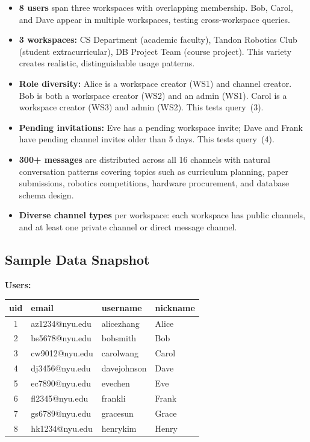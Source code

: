 \documentclass[11pt]{article}
\begin{document}
\begin{itemize}
    \item \textbf{8 users} span three workspaces with overlapping membership. Bob, Carol, and Dave appear in multiple workspaces, testing cross-workspace queries.
    \item \textbf{3 workspaces:} CS Department (academic faculty), Tandon Robotics Club (student extracurricular), DB Project Team (course project). This variety creates realistic, distinguishable usage patterns.
    \item \textbf{Role diversity:} Alice is a workspace creator (WS1) and channel creator. Bob is both a workspace creator (WS2) and an admin (WS1). Carol is a workspace creator (WS3) and admin (WS2). This tests query~(3).
    \item \textbf{Pending invitations:} Eve has a pending workspace invite; Dave and Frank have pending channel invites older than 5 days. This tests query~(4).
    \item \textbf{300+ messages} are distributed across all 16 channels with natural conversation patterns covering topics such as curriculum planning, paper submissions, robotics competitions, hardware procurement, and database schema design.
    \item \textbf{Diverse channel types} per workspace: each workspace has public channels, and at least one private channel or direct message channel.
\end{itemize}

\subsection{Sample Data Snapshot}

\noindent\textbf{Users:}
\begin{center}
\tiny
\begin{tabular}{clll}
\toprule
uid & email & username & nickname \\
\midrule
1 & az1234@nyu.edu & alicezhang & Alice \\
2 & bs5678@nyu.edu & bobsmith & Bob \\
3 & cw9012@nyu.edu & carolwang & Carol \\
4 & dj3456@nyu.edu & davejohnson & Dave \\
5 & ec7890@nyu.edu & evechen & Eve \\
6 & fl2345@nyu.edu & frankli & Frank \\
7 & gs6789@nyu.edu & gracesun & Grace \\
8 & hk1234@nyu.edu & henrykim & Henry \\
\bottomrule
\end{tabular}
\end{center}
\end{document}
